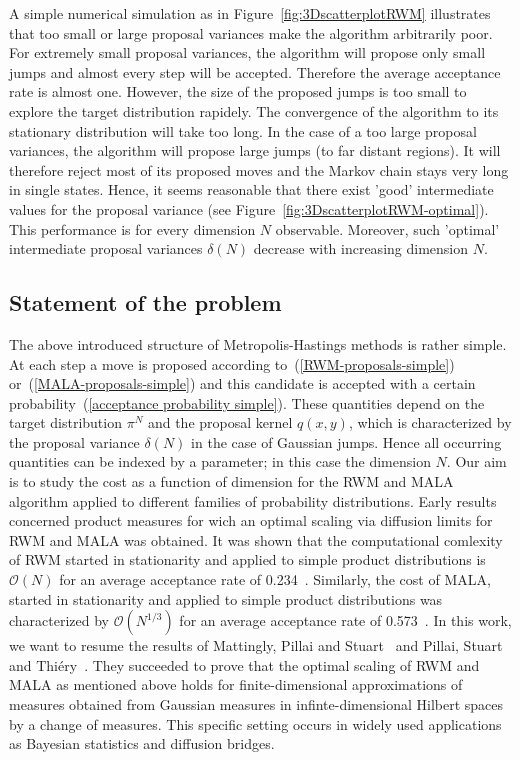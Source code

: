 A simple numerical simulation as in Figure~\ref{fig:3DscatterplotRWM} illustrates that too small or large proposal variances make the algorithm arbitrarily poor. For extremely small proposal variances, the algorithm will propose only small jumps and almost every step will be accepted. Therefore the average acceptance rate is almost one. However, the size of the proposed jumps is too small to explore the target distribution rapidely. The convergence of the algorithm to its stationary distribution will take too long. In the case of a too large proposal variances, the algorithm will propose large jumps (to far distant regions). It will therefore reject most of its proposed moves and the Markov chain stays very long in single states. Hence, it seems reasonable that there exist 'good' intermediate values for the proposal variance (see Figure~\ref{fig:3DscatterplotRWM-optimal}). This performance is for every dimension $N$ observable. Moreover, such 'optimal' intermediate proposal variances $ \delta(N) $ decrease with increasing dimension $N$.

\subsection*{Statement of the problem}

The above introduced structure of Metropolis-Hastings methods is rather simple. At each step a move is proposed according to~(\ref{RWM-proposals-simple}) or~(\ref{MALA-proposals-simple}) and this candidate is accepted with a certain probability~(\ref{acceptance probability simple}). These quantities depend on the target distribution $ \pi^{N} $ and the proposal kernel $ q(x,y) $, which is characterized by the proposal variance $ \delta(N) $ in the case of Gaussian jumps. Hence all occurring quantities can be indexed by a parameter; in this case the dimension $N$. Our aim is to study the cost as a function of dimension for the RWM and MALA algorithm applied to different families of probability distributions. Early results~\autocite{Roberts1997, Roberts1998} concerned product measures for wich an optimal scaling via diffusion limits for RWM and MALA was obtained. It was shown that the computational comlexity of RWM started in stationarity and applied to simple product distributions is $\mathcal{O}(N)$ for an average acceptance rate of 0.234~\autocite{Roberts1997}. Similarly, the cost of MALA, started in stationarity and applied to simple product distributions was characterized by $\mathcal{O}(N^{1/3})$ for an average acceptance rate of 0.573~\autocite{Roberts1998}. In this work, we want to resume the results of Mattingly, Pillai and Stuart~\autocite{Mattingly2010} and Pillai, Stuart and Thi\'{e}ry~\autocite{Pillai2012}. They succeeded to prove that the optimal scaling of RWM and MALA as mentioned above holds for finite-dimensional approximations of measures obtained from Gaussian measures in infinte-dimensional Hilbert spaces by a change of measures. This specific setting occurs in widely used applications as Bayesian statistics and diffusion bridges.

